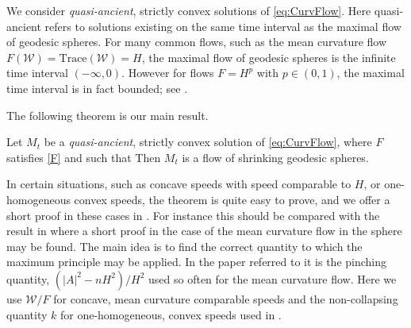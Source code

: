 \documentclass{amsart}
\begin{document}
We consider \emph{quasi-ancient}, strictly convex solutions of \eqref{eq:CurvFlow}. Here quasi-ancient refers to solutions existing on the same time interval as the maximal flow of geodesic spheres. For many common flows, such as the mean curvature flow \(F(\mathcal{W}) = \text{Trace}(\mathcal{W}) = H\), the maximal flow of geodesic spheres is the infinite time interval \((-\infty, 0)\). However for flows \(F = H^p\) with \(p \in (0,1)\), the maximal time interval is in fact bounded; see .

The following theorem is our main result.
\begin{thm}
Let \(M_t\) be a \emph{quasi-ancient}, strictly convex solution of \eqref{eq:CurvFlow}, where $F$ satisfies \cref{F} and such that
 Then \(M_t\) is a flow of shrinking geodesic spheres.
\end{thm}
In certain situations, such as concave speeds with speed comparable to \(H\), or one-homogeneous convex speeds, the theorem is quite easy to prove, and we offer a short proof in these cases in . For instance this should be compared with the result in \cite[Theorem]{HuiskenSinestrari:05/2014} where a short proof in the case of the mean curvature flow in the sphere may be found. The main idea is to find the correct quantity to which the maximum principle may be applied. In the paper referred to it is the pinching quantity, \((|A|^2 - n H^2)/H^2\) used so often for the mean curvature flow. Here we use \(\mathcal{W}/F\) for concave, mean curvature comparable speeds and the non-collapsing quantity \(k\) for one-homogeneous, convex speeds used in \cite{andrews2015Non-collapsing}.
\end{document}
